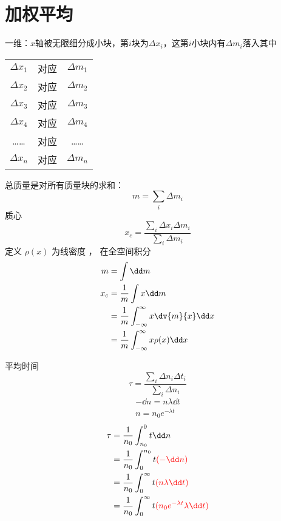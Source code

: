 
\section{加权平均}%

一维：\(x\)轴被无限细分成小块，第\(i\)块为\(\Delta x_i\)，这第\(i\)小块内有\(\Delta m_i\)落入其中
\begin{tabular}{ccc}
	\(\Delta x_1\) &   对应 & \(\Delta m_1\) \\
	\(\Delta x_2\) &   对应 & \(\Delta m_2\) \\
	\(\Delta x_3\) &   对应 & \(\Delta m_3\) \\
	\(\Delta x_4\) &   对应 & \(\Delta m_4\) \\
	…… & 对应 & …… \\
	\(\Delta x_n\) &   对应 & \(\Delta m_n\)
\end{tabular}

总质量是对所有质量块的求和：
\begin{equation*}
	m = \sum_i \Delta  m_i
\end{equation*}
质心
\begin{equation*}
	x_c =
	\frac{ \sum_i \Delta x_i \Delta m_i }{\sum_i \Delta m_i}
\end{equation*}
定义 \(\rho(x)\) 为线密度
， 在全空间积分
\begin{align*}
	m &= \int \dd m \\
	x_c  &= \frac{1}{m} \int x \dd m \\
	&= \frac{1}{m} \int_{-\infty}^{\infty} x \dv{m}{x} \dd x \\
	&= \frac{1}{m} \int_{-\infty}^{\infty} x \rho(x) \dd x \\
\end{align*}


平均时间
\begin{equation*}
	\tau =
	\frac{ \sum_i \Delta n_i \Delta t_i }{\sum_i \Delta n_i}
\end{equation*}
\begin{align*}
	- \dd n = n \lambda \dd t \\
	n = n_0 e^{-\lambda t}
\end{align*}
\begin{align*}
	\tau &=
	\frac{1}{n_0} \int^0_{n_0} t \dd n \\
			 &=
	\frac{1}{n_0} \int_0^{n_0} t \red{( - \dd n )} \\
			 &=
	\frac{1}{n_0} \int_0^{\infty} t \red{(n \lambda \dd t)} \\
			 &=
	\frac{1}{n_0} \int_0^{\infty} t \red{(n_0 e^{-\lambda t} \lambda \dd t)} \\
\end{align*}

